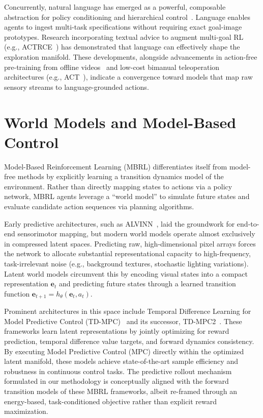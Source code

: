 Concurrently, natural language has emerged as a powerful, composable abstraction for policy conditioning and hierarchical control~\cite{luketina2019survey, jiang2019language}. Language enables agents to ingest multi-task specifications without requiring exact goal-image prototypes. Research incorporating textual advice to augment multi-goal RL (e.g., ACTRCE~\cite{actrce}) has demonstrated that language can effectively shape the exploration manifold. These developments, alongside advancements in action-free pre-training from offline videos~\cite{seo2022reinforcement} and low-cost bimanual teleoperation architectures (e.g., ACT~\cite{act}), indicate a convergence toward models that map raw sensory streams to language-grounded actions.

\section{World Models and Model-Based Control}

Model-Based Reinforcement Learning (MBRL) differentiates itself from model-free methods by explicitly learning a transition dynamics model of the environment. Rather than directly mapping states to actions via a policy network, MBRL agents leverage a ``world model'' to simulate future states and evaluate candidate action sequences via planning algorithms.

Early predictive architectures, such as ALVINN~\cite{pomerleau1988alvinn}, laid the groundwork for end-to-end sensorimotor mapping, but modern world models operate almost exclusively in compressed latent spaces. Predicting raw, high-dimensional pixel arrays forces the network to allocate substantial representational capacity to high-frequency, task-irrelevant noise (e.g., background textures, stochastic lighting variations). Latent world models circumvent this by encoding visual states into a compact representation $\mathbf{e}_t$ and predicting future states through a learned transition function $\mathbf{e}_{t+1} = h_\theta(\mathbf{e}_t, a_t)$.

Prominent architectures in this space include Temporal Difference Learning for Model Predictive Control (TD-MPC)~\cite{Hansen2022tdmpc} and its successor, TD-MPC2~\cite{hansen2024tdmpc2}. These frameworks learn latent representations by jointly optimizing for reward prediction, temporal difference value targets, and forward dynamics consistency. By executing Model Predictive Control (MPC) directly within the optimized latent manifold, these models achieve state-of-the-art sample efficiency and robustness in continuous control tasks. The predictive rollout mechanism formulated in our methodology is conceptually aligned with the forward transition models of these MBRL frameworks, albeit re-framed through an energy-based, task-conditioned objective rather than explicit reward maximization.

